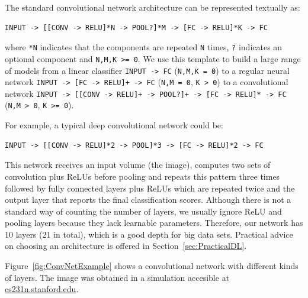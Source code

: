 \bigskip

The standard convolutional network architecture can be represented textually as:
\begin{verbatim}
INPUT -> [[CONV -> RELU]*N -> POOL?]*M -> [FC -> RELU]*K -> FC
\end{verbatim}
where \texttt{*N} indicates that the components are repeated \texttt{N} times, \texttt{?} indicates an optional component and \texttt{N,M,K >= 0}. We use this template to build a large range of models from a linear classifier \texttt{INPUT -> FC} (\texttt{N,M,K = 0}) to a regular neural network \texttt{INPUT -> [FC -> RELU]+ -> FC} (\texttt{N,M = 0}, \texttt{K > 0}) to a convolutional network \texttt{INPUT -> [[CONV -> RELU]+ -> POOL?]+ -> [FC -> RELU]* -> FC} (\texttt{N,M > 0}, \texttt{K >= 0}).

For example, a typical deep convolutional network could be:
\begin{verbatim}
INPUT -> [[CONV -> RELU]*2 -> POOL]*3 -> [FC -> RELU]*2 -> FC
\end{verbatim}
This network receives an input volume (the image), computes two sets of convolution plus ReLUs before pooling and repeats this pattern three times followed by fully connected layers plus ReLUs which are repeated twice and the output layer that reports the final classification scores. Although there is not a standard way of counting the number of layers, we usually ignore ReLU and pooling layers because they lack learnable parameters. Therefore, our network has 10 layers (21 in total), which is a good depth for big data sets. Practical advice on choosing an architecture is offered in Section~\ref{sec:PracticalDL}.

Figure~\ref{fig:ConvNetExample} shows a convolutional network with different kinds of layers. The image was obtained in a simulation accesible at \url{cs231n.stanford.edu}.

